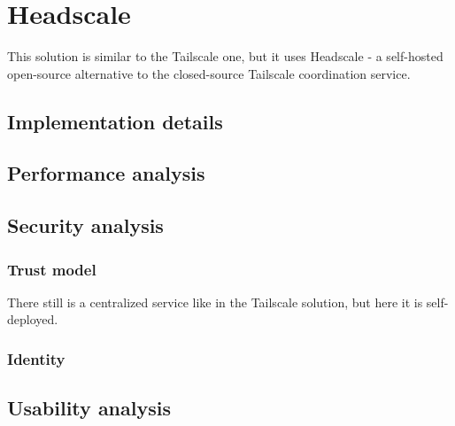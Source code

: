 \hypertarget{headscale}{%
\chapter{Headscale}\label{headscale}}

This solution is similar to the Tailscale one, but it uses Headscale - a
self-hosted open-source alternative to the closed-source Tailscale
coordination service.

\hypertarget{implementation-details}{%
\section{Implementation details}\label{implementation-details}}

\hypertarget{performance-analysis}{%
\section{Performance analysis}\label{performance-analysis}}

\hypertarget{security-analysis}{%
\section{Security analysis}\label{security-analysis}}

\hypertarget{trust-model}{%
\subsection{Trust model}\label{trust-model}}

There still is a centralized service like in the Tailscale solution, but
here it is self-deployed.

\hypertarget{identity}{%
\subsection{Identity}\label{identity}}

\hypertarget{usability-analysis}{%
\section{Usability analysis}\label{usability-analysis}}

